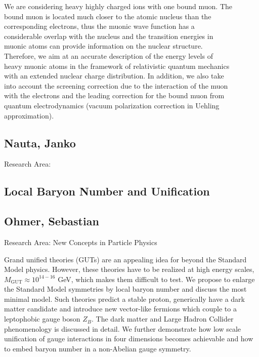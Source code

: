 \noindent We are considering heavy highly charged ions with one bound muon. The\\bound muon is located much closer to the atomic nucleus than the\\corresponding electrons, thus the muonic wave function has a\\considerable overlap with the nucleus and the transition energies in\\muonic atoms can provide information on the nuclear structure.\\Therefore, we aim at an accurate description of the energy levels of\\heavy muonic atoms in the framework of relativistic quantum mechanics\\with an extended nuclear charge distribution. In addition, we also take\\into account the screening correction due to the interaction of the muon\\with the electrons and the leading correction for the bound muon from\\quantum electrodynamics (vacuum polarization correction in Uehling\\approximation).
\newpage
\subsection*{\centering \large }
\subsection*{\centering \normalsize Nauta, Janko}
Research Area: \newline

\noindent 

\subsection*{\centering \large Local Baryon Number and Unification}
\subsection*{\centering \normalsize Ohmer, Sebastian}
Research Area: New Concepts in Particle Physics\newline

\noindent  Grand unified theories (GUTs) are an appealing idea for beyond the Standard Model physics. However, these theories have to be realized at high energy scales, $M_\text{GUT} \approx 10^{14-16}$ GeV, which makes them difficult to test. We propose to enlarge the Standard Model symmetries by local baryon number and discuss the most minimal model. Such theories predict a stable proton, generically have a dark matter candidate and introduce new vector-like fermions which couple to a leptophobic gauge boson $Z_B$. The dark matter and Large Hadron Collider phenomenology is discussed in detail. We further demonstrate how low scale unification of gauge interactions in four dimensions becomes achievable and how to embed baryon number in a non-Abelian gauge symmetry. 
\newpage
